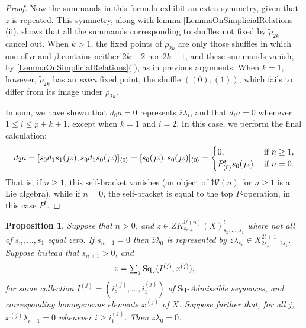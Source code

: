 \documentclass[11pt]{amsart}
\theoremstyle{plain}
\newtheorem{prop}[thm]{Proposition}
\theoremstyle{definition}
\newcommand{\calW}{\mathcal{W}}
\newcommand{\calU}{\mathcal{U}}
\theoremstyle{plain}
\newcommand{\Sq}{\mathrm{Sq}}
\newcommand{\Sqv}{\mathrm{Sq}_\textup{v}}
\begin{document}
\begin{Koszul complexes}
\begin{proof}
Now the summands in this formula exhibit an extra symmetry, given that $z$ is repeated. This symmetry, along with lemma \ref{LemmaOnSimplicialRelations}(ii), shows that all the summands corresponding to shuffles not fixed by $\widetilde{\rho}_{2k}$ cancel out. When $k>1$, the fixed points of $\widetilde{\rho}_{2k}$ are only those shuffles in which one of $\alpha$ and $\beta$ contains neither $2k-2$ nor $2k-1$, and these summands vanish, by \ref{LemmaOnSimplicialRelations}(i), as in previous arguments. When $k=1$, however, $\widetilde{\rho}_{2k}$ has an \emph{extra} fixed point, the shuffle $((0),(1))$, which fails to differ from its image under $\widetilde{\rho}_{2k}$.

In sum, we have shown that $d_0a=0$ represents $\overline{z}\lambda_i$, and that $d_ia=0$ whenever $1\leq i\leq p+k+1$, except when $k=1$ and $i=2$. In this case, we perform the final calculation:
\[d_2a=[s_{0}d_1s_1(\jmath z), s_{0}d_1s_0(\jmath z)]_{\langle 0\rangle}=[s_{0}(\jmath z), s_{0}(\jmath z)]_{\langle 0\rangle}=\begin{cases}
0,&\textup{if }n\geq1,\\
P^{t}_{\langle 0\rangle}s_0(\jmath z),&\textup{if }n=0.
\end{cases}\]
That is, if $n\geq1$, this self-bracket vanishes (an object of $\calW(n)$ for $n\geq1$ is a Lie algebra), while if $n=0$, the self-bracket is equal to the top $P$-operation, in this case $P^t$. %
\end{proof}
\begin{prop}\label{Q0ZeroByPriddyAlg}
Suppose that $n>0$, and $z\in ZK^{\calU(n)}_{s_{n+1}}(X)_{s_n,\ldots,s_1}^t$ where not all of $s_n,\ldots,s_1$ equal zero. If $s_{n+1}=0$ then $\overline{z}\lambda_0$ is represented by $z\lambda_{s_n}\in X_{2s_n,\ldots,2s_1}^{2t+1}$. Suppose instead that $s_{n+1}>0$, and 
\[z=\textstyle\sum_{j}\Sqv(I^{(j)},x^{(j)}),\]
for some collection $I^{(j)}=(i^{(j)}_{p},\ldots,i^{(j)}_{1})$ of  $\Sq$-Admissible sequences, and corresponding homogeneous elements $x^{(j)}$ of $X$. Suppose further that, for all $j$, $x^{(j)}\lambda_{i-1}=0$ whenever $i\geq i^{{(j)}}_1$. Then $\overline{z}\lambda_0=0$.
\end{prop}

\end{Koszul complexes}
\end{document}
